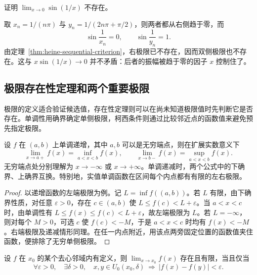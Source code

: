 \begin{example}
\label{ex:oscillatory-function-no-limit}
证明 $\lim_{x\to0}\sin(1/x)$ 不存在。
\end{example}

\begin{solve}
取 $x_n=1/(n\pi)$ 与 $y_n=1/(2n\pi+\pi/2)$，则两者都从右侧趋于零，而
\[
    \sin\frac1{x_n}=0,\qquad \sin\frac1{y_n}=1.
\]
由定理~\ref{thm:heine-sequential-criterion}，右极限已不存在，因而双侧极限也不存在。这与 $x\sin(1/x)\to0$ 并不矛盾：后者的振幅被趋于零的因子 $x$ 控制住了。
\end{solve}

\subsection{极限存在性定理和两个重要极限}
\label{subsec:limit-existence-and-two-important-limits}

极限的定义适合验证候选值，存在性定理则可以在尚未知道极限值时先判断它是否存在。单调性用确界确定单侧极限，柯西条件则通过比较邻近点的函数值来避免预先指定极限。

\begin{theorem}[单调函数的单侧极限]
\label{thm:monotone-function-one-sided-limits}
设 $f$ 在 $(a,b)$ 上单调递增，其中 $a,b$ 可以是无穷端点，则在扩展实数意义下
\begin{equation}
    \lim_{x\to a+}f(x)=\inf_{a<x<b}f(x),
    \qquad
    \lim_{x\to b-}f(x)=\sup_{a<x<b}f(x).
    \label{eq:monotone-function-endpoint-limits}
\end{equation}
无穷端点处分别理解为 $x\to-\infty$ 或 $x\to+\infty$。单调递减时，两个公式中的下确界、上确界互换。特别地，实值单调函数在区间每个内点都有有限的左右极限。
\end{theorem}

\begin{proof}
以递增函数的左端极限为例。记 $L=\inf f((a,b))$。若 $L$ 有限，由下确界性质，对任意 $\varepsilon>0$，存在 $c\in(a,b)$ 使 $L\leq f(c)<L+\varepsilon$。当 $a<x<c$ 时，由单调性有 $L\leq f(x)\leq f(c)<L+\varepsilon$，故左端极限为 $L$。若 $L=-\infty$，则对每个 $M>0$，可选 $c$ 使 $f(c)<-M$，于是 $a<x<c$ 时均有 $f(x)<-M$。右端极限及递减情形同理。在任一内点附近，用该点两旁固定位置的函数值夹住函数，便排除了无穷单侧极限。
\end{proof}

\begin{theorem}[函数极限的柯西收敛准则]
\label{thm:cauchy-criterion-for-function-limits}
设 $f$ 在 $x_0$ 的某个去心邻域内有定义，则 $\lim_{x\to x_0}f(x)$ 存在且有限，当且仅当
\begin{equation}
    \forall\varepsilon>0,\quad\exists\delta>0,\quad
    x,y\in U_0(x_0,\delta)\ \Longrightarrow\ |f(x)-f(y)|<\varepsilon.
    \label{eq:cauchy-condition-for-function-limits}
\end{equation}
\end{theorem}

